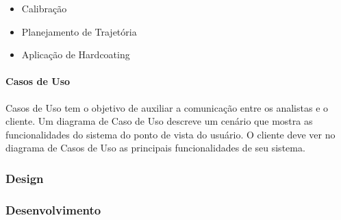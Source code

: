 \documentclass[12pt,a4paper]{article}
\begin{document}
\begin{itemize}
  \item Calibração
  \item Planejamento de Trajetória
  \item Aplicação de Hardcoating
\end{itemize}

\paragraph{Casos de Uso}
Casos de Uso tem o objetivo de auxiliar a comunicação entre os
analistas e o cliente.
Um diagrama de Caso de Uso descreve um cenário que mostra as funcionalidades do sistema do ponto de vista do usuário. 
O cliente deve ver no diagrama de Casos de Uso as principais funcionalidades de seu sistema.




\subsubsection{Design}

\subsubsection{Desenvolvimento}
\end{document}
